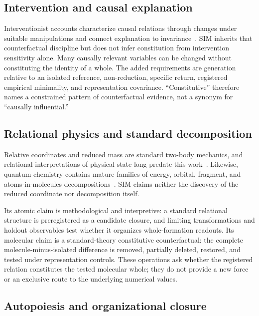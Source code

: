\documentclass[11pt,a4paper]{article}
\begin{document}
\subsection{Intervention and causal explanation}

Interventionist accounts characterize causal relations through changes under suitable manipulations and connect explanation to invariance~\cite{pearl2000,woodward2003}. SIM inherits that counterfactual discipline but does not infer constitution from intervention sensitivity alone. Many causally relevant variables can be changed without constituting the identity of a whole. The added requirements are generation relative to an isolated reference, non-reduction, specific return, registered empirical minimality, and representation covariance. ``Constitutive'' therefore names a constrained pattern of counterfactual evidence, not a synonym for ``causally influential.''

\subsection{Relational physics and standard decomposition}

Relative coordinates and reduced mass are standard two-body mechanics, and relational interpretations of physical state long predate this work~\cite{landau1977,rovelli1996}. Likewise, quantum chemistry contains mature families of energy, orbital, fragment, and atoms-in-molecules decompositions~\cite{morokuma1971,kitaura1976,bickelhaupt2000,stone2013}. SIM claims neither the discovery of the reduced coordinate nor decomposition itself.

Its atomic claim is methodological and interpretive: a standard relational structure is preregistered as a candidate closure, and limiting transformations and holdout observables test whether it organizes whole-formation readouts. Its molecular claim is a standard-theory constitutive counterfactual: the complete molecule-minus-isolated difference is removed, partially deleted, restored, and tested under representation controls. These operations ask whether the registered relation constitutes the tested molecular whole; they do not provide a new force or an exclusive route to the underlying numerical values.

\subsection{Autopoiesis and organizational closure}
\end{document}

